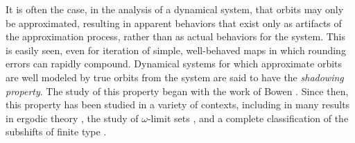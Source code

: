 \documentclass{amsart}
\numberwithin{equation}{section}
\newcommand{\comment}[1]{\textcolor{red}{#1}}
\begin{document}
It is often the case, in the analysis of a dynamical system, that orbits may only be approximated, resulting in apparent behaviors that exist only as artifacts of the approximation process, rather than as actual behaviors for the system. This is easily seen, even for iteration of simple, well-behaved maps in which rounding errors can rapidly compound. Dynamical systems for which approximate orbits are well modeled by true orbits from the system are said to have the \emph{shadowing property}. The study of this property began with the work of Bowen \cite{bowenshadowintro}. Since then, this property has been studied in a variety of contexts, including in many results in ergodic theory \cite{ergodiconcompact}, the study of $\omega$-limit sets \cite{Shadowingomegajulia}, and a complete classification of the subshifts of finite type \cite{Walters1978}. 

\end{document}
